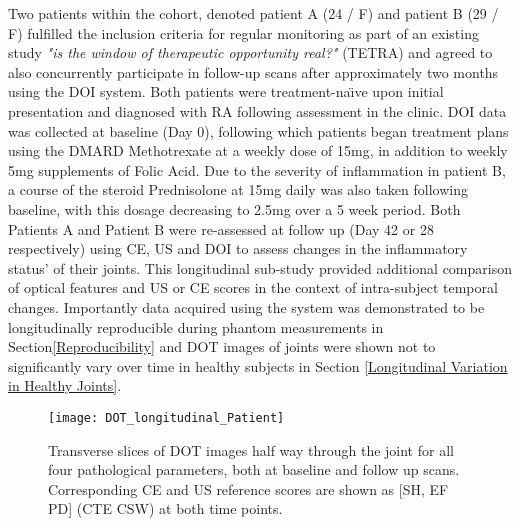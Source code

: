 \documentclass[twoside]{bhamthesis}
\theoremstyle{definition}
\begin{document}
Two patients within the cohort, denoted patient A (24 / F) and patient B (29 / F) fulfilled the inclusion criteria for regular monitoring as part of an existing study \textit{"is the window of therapeutic opportunity real?"} (TETRA) and agreed to also concurrently participate in follow-up scans after approximately two months using the DOI system. Both patients were treatment-na\"{\i}ve upon initial presentation and diagnosed with RA following assessment in the clinic. DOI data was collected at baseline (Day 0), following which patients began treatment plans using the DMARD Methotrexate at a weekly dose of 15mg, in addition to weekly 5mg supplements of Folic Acid. Due to the severity of inflammation in patient B, a course of the steroid Prednisolone at 15mg daily was also taken following baseline, with this dosage decreasing to 2.5mg over a 5 week period. Both Patients A and Patient B were re-assessed at follow up (Day 42 or 28 respectively) using CE, US and DOI to assess changes in the inflammatory status' of their joints. This longitudinal sub-study provided additional comparison of optical features and US or CE scores in the context of intra-subject temporal changes. Importantly data acquired using the system was demonstrated to be longitudinally reproducible during phantom measurements in Section\ref{Reproducibility} and DOT images of joints were shown not to significantly vary over time in healthy subjects in Section \ref{Longitudinal Variation in Healthy Joints}.

\begin{figure}[!ht]
\centering\texttt{[image: DOT\_longitudinal\_Patient]}\caption{Transverse slices of DOT images half way through the joint for all four pathological parameters, both at baseline and follow up scans. Corresponding CE and US reference scores are shown as [SH, EF PD] (CTE CSW) at both time points.}
\label{DOT_longitudinal_Patient}
\end{figure}
\end{document}
